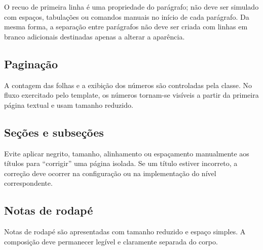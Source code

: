 
O recuo de primeira linha é uma propriedade do parágrafo; não deve ser simulado com espaços, tabulações ou comandos manuais no início de cada parágrafo. Da mesma forma, a separação entre parágrafos não deve ser criada com linhas em branco adicionais destinadas apenas a alterar a aparência.

\subsection{Paginação}

A contagem das folhas e a exibição dos números são controladas pela classe. No fluxo exercitado pelo template, os números tornam-se visíveis a partir da primeira página textual e usam tamanho reduzido.


\subsection{Seções e subseções}



Evite aplicar negrito, tamanho, alinhamento ou espaçamento manualmente aos títulos para “corrigir” uma página isolada. Se um título estiver incorreto, a correção deve ocorrer na configuração ou na implementação do nível correspondente.

\subsection{Notas de rodapé}

Notas de rodapé são apresentadas com tamanho reduzido e espaço simples. A composição deve permanecer legível e claramente separada do corpo.

